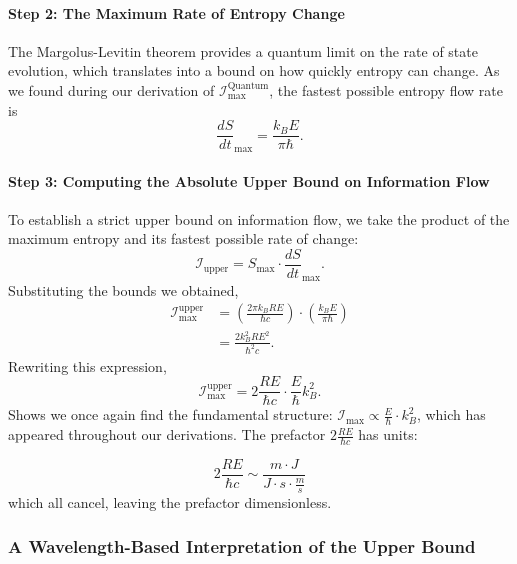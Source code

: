 \documentclass[12pt]{article}
\begin{document}
\paragraph{Step 2: The Maximum Rate of Entropy Change}

The Margolus-Levitin theorem provides a quantum limit on the rate of state evolution, which translates into a bound on how quickly entropy can change. As we found during our derivation of $\mathcal{I}_{\text{max}}^{\text{Quantum}}$, the fastest possible entropy flow rate is
\begin{equation}
    \frac{dS}{dt}_{\max} = \frac{k_B E}{\pi \hbar}.
\end{equation}

\paragraph{Step 3: Computing the Absolute Upper Bound on Information Flow}

To establish a strict upper bound on information flow, we take the product of the maximum entropy and its fastest possible rate of change:
\begin{equation}
    \mathcal{I}_{\text{upper}} = S_{\max} \cdot \frac{dS}{dt}_{\max}.
\end{equation}
Substituting the bounds we obtained,
\begin{align}
    \mathcal{I}_{\text{max}}^{\text{upper}} &= \left(\frac{2\pi k_B R E}{\hbar c}\right) \cdot \left(\frac{k_B E}{\pi \hbar}\right) \nonumber \\
    &= \frac{2 k_B^2 R E^2}{\hbar^2 c}.
\end{align}
Rewriting this expression,
\begin{equation}
    \mathcal{I}_{\text{max}}^{\text{upper}} = 2 \frac{R E}{\hbar c} \cdot \frac{E}{\hbar} k_B^2.
\end{equation}
Shows we once again find the fundamental structure: \(\mathcal{I}_{\max} \propto \frac{E}{\hbar} \cdot k_B^2\), which has appeared throughout our derivations.
The prefactor $2 \frac{R E}{\hbar c}$ has units:

\begin{equation}
    2 \frac{R E}{\hbar c} \sim \frac{m \cdot J}{J \cdot s \cdot \frac{m}{s}}
\end{equation}
which all cancel, leaving the prefactor dimensionless.

\subsubsection{A Wavelength-Based Interpretation of the Upper Bound}
\end{document}
